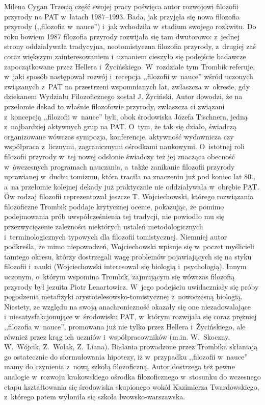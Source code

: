 \begin{newrevplenv}{Milena Cygan}
Trzecią część swojej pracy poświęca autor rozwojowi filozofii przyrody na PAT w~latach 1987--1993. Bada, jak przyjęła się nowa filozofia przyrody (,,filozofia w~nauce'') i~jak wchodziła w~stadium swojego rozkwitu. Do roku bowiem 1987 filozofia przyrody rozwijała się tam dwutorowo: z~jednej strony oddziaływała tradycyjna, neotomistyczna filozofia przyrody, z~drugiej zaś coraz większym zainteresowaniem i~uznaniem cieszyło się podejście badawcze zapoczątkowane przez Hellera i~Życińskiego. W~rozdziale tym Trombik referuje, w~jaki sposób następował rozwój i~recepcja ,,filozofii w~nauce'' wśród uczonych związanych z~PAT na przestrzeni wspomnianych lat, zwłaszcza w~okresie, gdy dziekanem Wydziału Filozoficznego został J. Życiński. Autor dowodzi, że na przełomie dekad to właśnie filozofowie przyrody, zwłaszcza ci związani z~koncepcją ,,filozofii w~nauce'' byli, obok środowiska Józefa Tischnera, jedną z~najbardziej aktywnych grup na PAT. O~tym, że tak się działo, świadczą organizowane wówczas sympozja, konferencje, aktywność wydawnicza czy współpraca z~licznymi, zagranicznymi ośrodkami naukowymi. O~istotnej roli filozofii przyrody w~tej nowej odsłonie świadczy też jej znacząca obecność w~ówczesnych programach nauczania, a~także zanikanie filozofii przyrody uprawianej w~duchu tomizmu, która traciła na znaczeniu już pod koniec lat 80., a~na przełomie kolejnej dekady już praktycznie nie oddziaływała w~obrębie PAT. Ów rodzaj filozofii reprezentował jeszcze T. Wojciechowski, którego rozwiązania filozoficzne Trombik poddaje krytycznej ocenie, pokazując, że pomimo podejmowania prób uwspółcześnienia tej tradycji, nie powiodło mu się przezwyciężenie zależności niektórych ustaleń metodologicznych i~terminologicznych typowych dla filozofii tomistycznej. Niemniej autor podkreśla, że mimo niepowodzeń, Wojciechowski wpisuje się w~poczet myślicieli tamtego okresu, którzy dostrzegali wagę problemów pojawiających się na styku filozofii i~nauki (Wojciechowski interesował się biologią i~psychologią). Innym uczonym, o~którym wspomina Trombik, zajmującym się wówczas filozofią przyrody był jezuita Piotr Lenartowicz. W~jego podejściu uwidaczniały się próby pogodzenia metafizyki arystotelesowsko-tomistycznej z~nowoczesną biologią. Niestety, ze względu na swoją anachroniczność okazały się one niezadowalające i~niesatysfakcjonujące w~środowisku PAT, w~którym rozwijała się coraz prężniej ,,filozofia w~nauce'', promowana już nie tylko przez Hellera i~Życińskiego, ale również przez krąg ich uczniów i~współpracowników (m.in. W.~Skoczny, W.~Wójcik, Z.~Wolak, Z.~Liana). Badania prowadzone przez Trombika skłaniają go ostatecznie do sformułowania hipotezy, iż w~przypadku ,,filozofii w~nauce'' mamy do czynienia z~nową szkołą filozoficzną. Autor dostrzega też pewne analogie w~rozwoju krakowskiego ośrodka filozoficznego w~stosunku do wczesnego etapu kształtowania się środowiska skupionego wokół Kazimierza Twardowskiego, z~którego potem wyłoniła się szkoła lwowsko-warszawska.


\end{newrevplenv}
